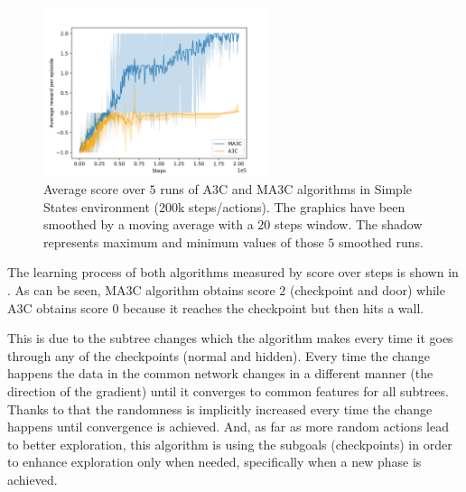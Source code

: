 \begin{figure}[hbtp]
\begin{center}
\includegraphics[width=250]{img/SimpleStates_performance.png}
\end{center}
\caption[Simple States performance]
{Average score over $5$ runs of \ac{A3C} and \ac{MA3C} algorithms in Simple States environment (200k steps/actions).
The graphics have been smoothed by a moving average with a $20$ steps window.
The shadow represents maximum and minimum values of those $5$ smoothed runs.}
\label{fig:SimpleStates_performance}
\end{figure}

The learning process of both algorithms measured by score over steps is shown in .
As can be seen, \ac{MA3C} algorithm obtains score $2$ (checkpoint and door) while \ac{A3C} obtains score $0$ because it
reaches the checkpoint but then hits a wall.

This is due to the subtree changes which the algorithm makes every time it goes through any of the checkpoints (normal
and hidden).
Every time the change happens the data in the common network changes in a different manner (the direction of the gradient)
until it converges to common features for all subtrees.
Thanks to that the randomness is implicitly increased every time the change happens until convergence is achieved.
And, as far as more random actions lead to better exploration, this algorithm is using the subgoals (checkpoints) in
order to enhance exploration only when needed, specifically when a new phase is achieved.

